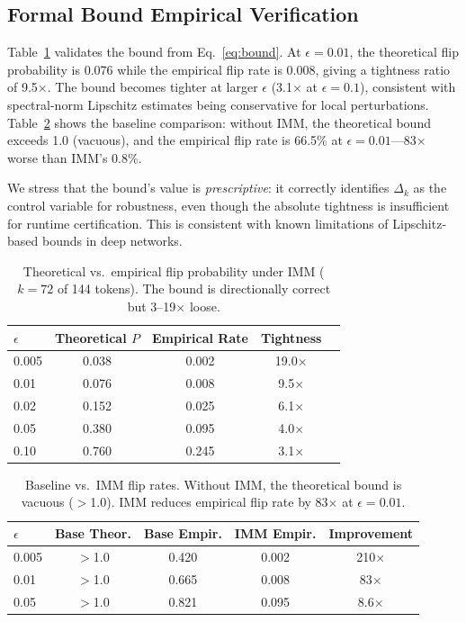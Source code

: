 \documentclass[10pt,twocolumn]{article}
\begin{document}
\subsection{Formal Bound Empirical Verification}
\label{sec:bound_exp}

Table~\ref{tab:bound} validates the bound from Eq.~\ref{eq:bound}. At $\epsilon{=}0.01$, the theoretical flip probability is 0.076 while the empirical flip rate is 0.008, giving a tightness ratio of 9.5$\times$. The bound becomes tighter at larger $\epsilon$ (3.1$\times$ at $\epsilon{=}0.1$), consistent with spectral-norm Lipschitz estimates being conservative for local perturbations. Table~\ref{tab:bound_baseline} shows the baseline comparison: without IMM, the theoretical bound exceeds 1.0 (vacuous), and the empirical flip rate is 66.5\% at $\epsilon{=}0.01$---83$\times$ worse than IMM's 0.8\%.

We stress that the bound's value is \emph{prescriptive}: it correctly identifies $\Delta_k$ as the control variable for robustness, even though the absolute tightness is insufficient for runtime certification. This is consistent with known limitations of Lipschitz-based bounds in deep networks.

\begin{table}[t]
\centering
\caption{Theoretical vs.\ empirical flip probability under IMM ($k{=}72$ of 144 tokens). The bound is directionally correct but 3--19$\times$ loose.}
\label{tab:bound}
\small
\begin{tabular}{@{}lcccc@{}}
\toprule
$\epsilon$ & Theoretical $P$ & Empirical Rate & Tightness \\
\midrule
0.005 & 0.038 & 0.002 & 19.0$\times$ \\
0.01  & 0.076 & 0.008 & 9.5$\times$ \\
0.02  & 0.152 & 0.025 & 6.1$\times$ \\
0.05  & 0.380 & 0.095 & 4.0$\times$ \\
0.10  & 0.760 & 0.245 & 3.1$\times$ \\
\bottomrule
\end{tabular}
\end{table}

\begin{table}[t]
\centering
\caption{Baseline vs.\ IMM flip rates. Without IMM, the theoretical bound is vacuous ($>$1.0). IMM reduces empirical flip rate by 83$\times$ at $\epsilon{=}0.01$.}
\label{tab:bound_baseline}
\small
\begin{tabular}{@{}lcccc@{}}
\toprule
$\epsilon$ & Base Theor. & Base Empir. & IMM Empir. & Improvement \\
\midrule
0.005 & $>$1.0 & 0.420 & 0.002 & 210$\times$ \\
0.01  & $>$1.0 & 0.665 & 0.008 & 83$\times$ \\
0.05  & $>$1.0 & 0.821 & 0.095 & 8.6$\times$ \\
\bottomrule
\end{tabular}
\end{table}
\end{document}
